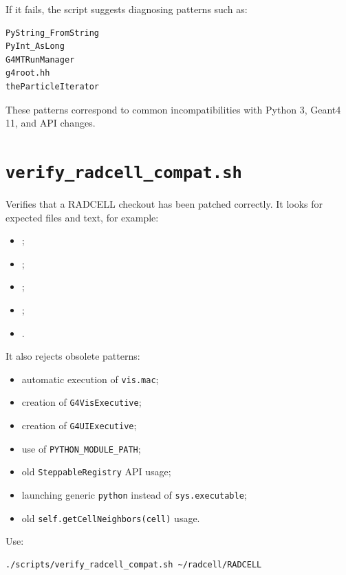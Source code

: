 \documentclass[11pt,a4paper,twoside,pdftex]{refrep}
\begin{document}
If it fails, the script suggests diagnosing patterns such as:

\begin{lstlisting}
PyString_FromString
PyInt_AsLong
G4MTRunManager
g4root.hh
theParticleIterator
\end{lstlisting}

These patterns correspond to common incompatibilities with Python 3, Geant4 11, and API changes.

\section{\texttt{verify\_radcell\_compat.sh}}

Verifies that a RADCELL checkout has been patched correctly. It looks for expected files and text, for example:

\begin{itemize}
  \item {};
  \item {};
  \item {};
  \item {};
  \item {}.
\end{itemize}

It also rejects obsolete patterns:

\begin{itemize}
  \item automatic execution of \texttt{vis.mac};
  \item creation of \texttt{G4VisExecutive};
  \item creation of \texttt{G4UIExecutive};
  \item use of \texttt{PYTHON\_MODULE\_PATH};
  \item old \texttt{SteppableRegistry} API usage;
  \item launching generic \texttt{python} instead of \texttt{sys.executable};
  \item old \texttt{self.getCellNeighbors(cell)} usage.
\end{itemize}

Use:

\begin{lstlisting}
./scripts/verify_radcell_compat.sh ~/radcell/RADCELL
\end{lstlisting}
\end{document}
